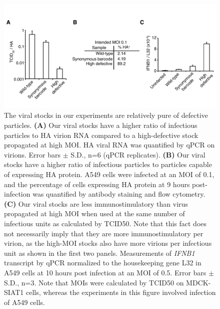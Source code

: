\documentclass[9pt,lineno]{elife}
\begin{document}
\begin{figure}
\centerline{\includegraphics[width=0.7\linewidth]{figures/Validating_barcode_virus/validating_populations_D02.pdf}}
\caption{\label{fig:viruspopulations} The viral stocks in our experiments are relatively pure of defective particles. 
{\bf (A)}
Our viral stocks have a higher ratio of infectious particles to HA virion RNA compared to a high-defective stock propagated at high MOI.
HA viral RNA was quantified by qPCR on virions. 
Error bars $\pm$ S.D., n=6 (qPCR replicates). 
{\bf (B)} 
Our viral stocks have a higher ratio of infectious particles to particles capable of expressing HA protein.
A549 cells were infected at an MOI of 0.1, and the percentage of cells expressing HA protein at 9 hours post-infection was quantified by antibody staining and flow cytometry.
{\bf (C)} 
Our viral stocks are less immunostimulatory than virus propagated at high MOI when used at the same number of infectious units as calculated by TCID50.
Note that this fact does not necessarily imply that they are more immunostimulatory per virion, as the high-MOI stocks also have more virions per infectious unit as shown in the first two panels. 
Measurements of \textit{IFNB1} transcript by qPCR normalized to the housekeeping gene L32 in A549 cells at 10 hours post infection at an MOI of 0.5.
Error bars $\pm$ S.D., n=3.
Note that MOIs were calculated by TCID50 on MDCK-SIAT1 cells, whereas the experiments in this figure involved infection of A549 cells.
}
\end{figure}
\end{document}
